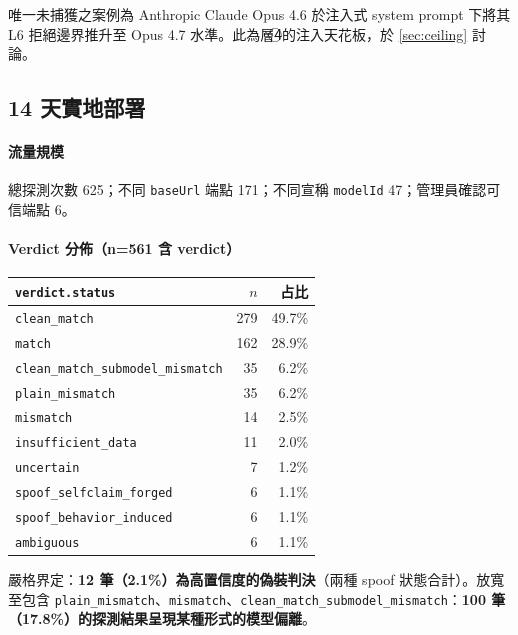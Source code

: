 \documentclass[UTF8,fontset=none,10pt,a4paper,twocolumn]{ctexart}
\begin{document}
唯一未捕獲之案例為 Anthropic Claude Opus 4.6 於注入式 system prompt 下將其 L6 拒絕邊界推升至 Opus 4.7 水準。此為層\textcircled{\scriptsize 4}的注入天花板，於 \cref{sec:ceiling} 討論。

\subsection{14 天實地部署}\label{sec:field}

\paragraph{流量規模}
總探測次數 625；不同 \texttt{baseUrl} 端點 171；不同宣稱 \texttt{modelId} 47；管理員確認可信端點 6。

\paragraph{Verdict 分佈（n=561 含 verdict）}
\begin{table}[h]
\centering
\small
\begin{tabular}{@{}lrr@{}}
\toprule
\texttt{verdict.status} & $n$ & 占比 \\
\midrule
\texttt{clean\_match} & 279 & 49.7\% \\
\texttt{match} & 162 & 28.9\% \\
\texttt{clean\_match\_submodel\_mismatch} & 35 & 6.2\% \\
\texttt{plain\_mismatch} & 35 & 6.2\% \\
\texttt{mismatch} & 14 & 2.5\% \\
\texttt{insufficient\_data} & 11 & 2.0\% \\
\texttt{uncertain} & 7 & 1.2\% \\
\texttt{spoof\_selfclaim\_forged} & 6 & 1.1\% \\
\texttt{spoof\_behavior\_induced} & 6 & 1.1\% \\
\texttt{ambiguous} & 6 & 1.1\% \\
\bottomrule
\end{tabular}
\end{table}

嚴格界定：\textbf{12 筆（2.1\%）為高置信度的偽裝判決}（兩種 spoof 狀態合計）。放寬至包含 \texttt{plain\_mismatch}、\texttt{mismatch}、\texttt{clean\_match\_submodel\_mismatch}：\textbf{100 筆（17.8\%）的探測結果呈現某種形式的模型偏離}。
\end{document}
